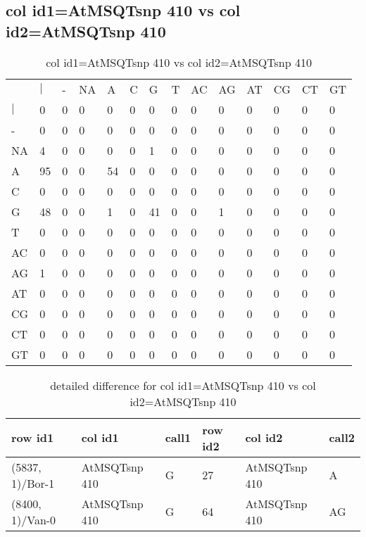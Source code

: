 \subsection{col id1=AtMSQTsnp 410 vs col id2=AtMSQTsnp 410}
\begin{center}
\begin{longtable}{|l|l|l|l|l|l|l|l|l|l|l|l|l|l|}
\caption{col id1=AtMSQTsnp 410 vs col id2=AtMSQTsnp 410} \label{table_dm736}\\
\hline
\\
\hline
&$|$&-&NA&A&C&G&T&AC&AG&AT&CG&CT&GT\\
$|$&0&0&0&0&0&0&0&0&0&0&0&0&0\\
-&0&0&0&0&0&0&0&0&0&0&0&0&0\\
NA&4&0&0&0&0&1&0&0&0&0&0&0&0\\
A&95&0&0&54&0&0&0&0&0&0&0&0&0\\
C&0&0&0&0&0&0&0&0&0&0&0&0&0\\
G&48&0&0&1&0&41&0&0&1&0&0&0&0\\
T&0&0&0&0&0&0&0&0&0&0&0&0&0\\
AC&0&0&0&0&0&0&0&0&0&0&0&0&0\\
AG&1&0&0&0&0&0&0&0&0&0&0&0&0\\
AT&0&0&0&0&0&0&0&0&0&0&0&0&0\\
CG&0&0&0&0&0&0&0&0&0&0&0&0&0\\
CT&0&0&0&0&0&0&0&0&0&0&0&0&0\\
GT&0&0&0&0&0&0&0&0&0&0&0&0&0\\
\hline
\end{longtable}
\end{center}

\begin{center}
\begin{longtable}{|l|l|l|l|l|l|}
\caption{detailed difference for col id1=AtMSQTsnp 410 vs col id2=AtMSQTsnp 410} \label{table_dm737}\\
\hline
row id1&col id1&call1&row id2&col id2&call2\\
\hline
(5837, 1)/Bor-1&AtMSQTsnp 410&G&27&AtMSQTsnp 410&A\\
(8400, 1)/Van-0&AtMSQTsnp 410&G&64&AtMSQTsnp 410&AG\\
\hline
\end{longtable}
\end{center}

